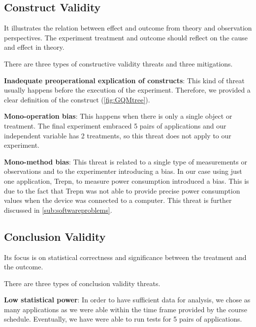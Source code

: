 \subsection{Construct Validity}
It illustrates the relation between effect and outcome from theory and observation perspectives. The experiment treatment and outcome should reflect on the cause and effect in theory.

There are three types of constructive validity threats and three mitigations.

\textbf{Inadequate preoperational explication of constructs}: This kind of threat usually happens before the execution of the experiment. Therefore, we provided a clear definition of the construct (\autoref{fig:GQMtree}).

\textbf{Mono-operation bias}: This happens when there is only a single object or treatment. The final experiment embraced 5 pairs of applications and our independent variable has 2 treatments, so this threat does not apply to our experiment.



\textbf{Mono-method bias}: This threat is related to a single type of measurements or observations and to the experimenter introducing a bias. In our case using just one application, Trepn, to measure power consumption introduced a bias. This is due to the fact that Trepn was not able to provide precise power consumption values when the device was connected to a computer. This threat is further discussed in \autoref{sub:softwareproblems}.







\subsection{Conclusion Validity}
Its focus is on statistical correctness and significance between the treatment and the outcome.

There are three types of conclusion validity threats.

\textbf{Low statistical power}: In order to have sufficient data for analysis, we chose as many applications as we were able within the time frame provided by the course schedule. Eventually, we have were able to run tests for 5 pairs of applications.


